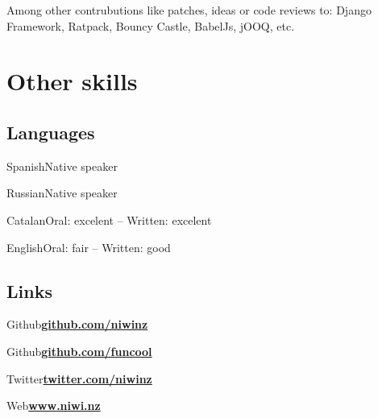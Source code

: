 \documentclass[letterpaper]{cv} %
\begin{document}
Among other contrubutions like patches, ideas or code reviews to: Django
Framework, Ratpack, Bouncy Castle, BabelJs, jOOQ, etc.

\sectionspace

\section{Other skills}

\begin{multicols}{2}

  \subsection{Languages}
  \sectionspace

  \begin{factlist}
  \item{Spanish}{Native speaker}
  \item{Russian}{Native speaker}
  \item{Catalan}{Oral: excelent -- Written: excelent}
  \item{English}{Oral: fair -- Written: good}
  \end{factlist}

  \columnbreak

  \subsection{Links}
  \sectionspace

  \begin{factlist}
  \item{Github}{\href{https://github.com/niwinz}{\bf github.com/niwinz}}
  \item{Github}{\href{https://github.com/funcool}{\bf github.com/funcool}}
  \item{Twitter}{\href{https://twitter.com/niwinz}{\bf twitter.com/niwinz}}
  \item{Web}{\href{https://www.niwi.nz}{\bf www.niwi.nz}}
  \end{factlist}

\end{multicols}
\end{document}
